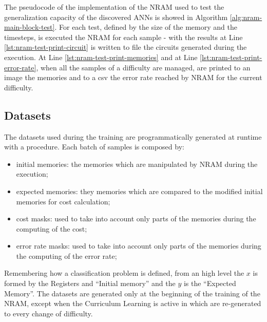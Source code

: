 The pseudocode of the implementation of the NRAM used to test the generalization capacity of the discovered ANNs is showed in Algorithm \ref{alg:nram-main-block-test}. For each test, defined by the size of the memory and the timesteps, is executed the NRAM for each sample - with the results at Line \ref{lst:nram-test-print-circuit} is written to file the circuits generated during the execution. At Line \ref{lst:nram-test-print-memories} and at Line \ref{lst:nram-test-print-error-rate}, when all the samples of a difficulty are managed, are printed to an image the memories and to a csv the error rate reached by NRAM for the current difficulty. 


\subsection{Datasets}\label{subsubsec:nram-dataset}
The datasets used during the training are programmatically generated at runtime with a procedure. Each batch of samples is composed by:
\begin{itemize}
	\item{initial memories: the memories which are manipulated by NRAM during the execution;}
	\item{expected memories: they memories which are compared to the modified initial memories for cost calculation;}
	\item{cost masks: used to take into account only parts of the memories during the computing of the cost;}
	\item{error rate masks: used to take into account only parts of the memories during the computing of the error rate;}
\end{itemize}
Remembering how a classification problem is defined, from an high level the $x$ is formed by the Registers and ``Initial memory'' and the $y$ is the ``Expected Memory''. The datasets are generated only at the beginning of the training of the NRAM, except when the Curriculum Learning is active in which are re-generated to every change of difficulty.

